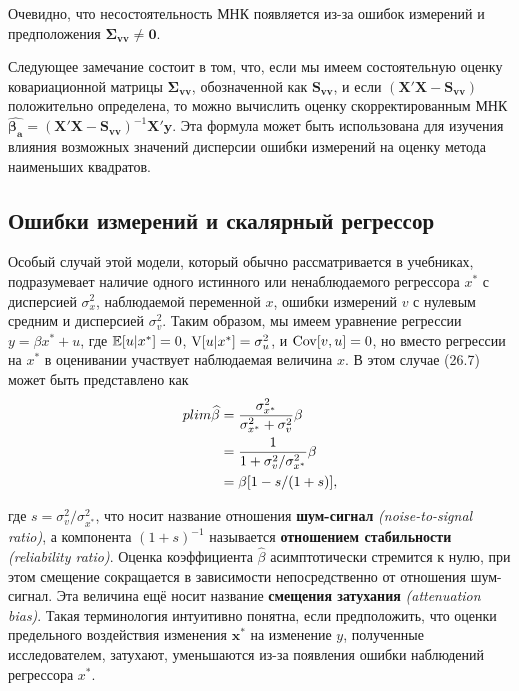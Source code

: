 Очевидно, что несостоятельность МНК появляется из-за ошибок измерений и предположения $\mathbf{\Sigma_{vv}}\neq\mathbf{0}$.

Следующее замечание состоит в том, что, если мы имеем состоятельную оценку ковариационной матрицы $\mathbf{\Sigma_{vv}}$, обозначенной как $\mathbf{S_{vv}}$, и если $(\mathbf{X'X}-\mathbf{S_{vv}})$ положительно определена, то можно вычислить оценку скорректированным МНК $\mathbf{\widehat {\beta_a}}={(\mathbf{X'X}-\mathbf{S_{vv}})}^{-1}\mathbf{X'y}$. Эта формула может быть использована для изучения влияния возможных значений дисперсии ошибки измерений на оценку метода наименьших квадратов.

\subsection{Ошибки измерений и скалярный регрессор}
Особый случай этой модели, который обычно рассматривается в учебниках, подразумевает наличие одного истинного или ненаблюдаемого регрессора $x^*$ с дисперсией $\sigma^2_x$, наблюдаемой переменной $x$, ошибки измерений $v$ с нулевым средним и дисперсией $\sigma^2_v$. Таким образом, мы имеем уравнение регрессии $y=\beta x^*+u$, где $\mathbb{E}[u|x^*]=0$, $\mathrm{V}[u|x^*]=\sigma^2_u$,  и $\mathrm{Cov}[v,u]=0$, но вместо регрессии на $x^*$ в оценивании участвует наблюдаемая величина $x$. 
В этом случае (26.7) может быть представлено как
\begin{align}
plim\widehat {\beta}&=\frac{\sigma^2_{x^*}}{\sigma^2_{x^*}+\sigma^2_v}\beta \\
&=\frac{1}{1+\sigma^2_v / \sigma^2_{x^*}}\beta \notag \\
&=\beta[1-s/(1+s)], \notag 
\end{align}

где $s=\sigma^2_v / \sigma^2_{x^*}$, что носит название отношения {\bf шум-сигнал} \emph{(noise-to-signal ratio)}, а компонента ${(1+s)}^{-1}$ называется {\bf отношением стабильности} \emph{(reliability ratio)}. Оценка коэффициента $\widehat {\beta}$ асимптотически стремится к нулю, при этом смещение сокращается в зависимости непосредственно от отношения шум-сигнал. Эта величина ещё носит название {\bf смещения затухания} \emph{(attenuation bias)}. Такая терминология интуитивно понятна, если предположить, что оценки предельного воздействия изменения $\mathbf{x^*}$ на изменение $y$, полученные исследователем, затухают, уменьшаются из-за появления ошибки наблюдений регрессора $x^*$. 
  
